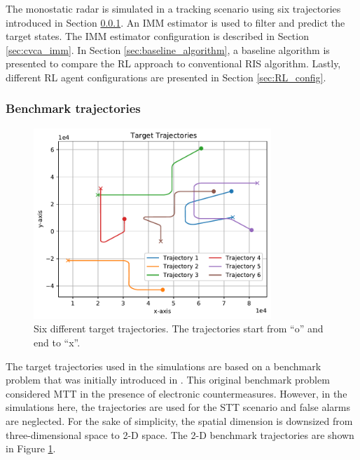 \documentclass[english, 12pt, a4paper, elec, utf8, a-1b, online]{aaltothesis}
\numberwithin{equation}{section}
\begin{document}
The monostatic radar is simulated in a tracking scenario using six trajectories introduced in Section \ref{sec:benchmark_trajectories}.
An IMM estimator is used to filter and predict the target states. 
The IMM estimator configuration is described in Section \ref{sec:cvca_imm}.
In Section \ref{sec:baseline_algorithm}, a baseline algorithm is presented to compare the RL approach to conventional RIS algorithm.
Lastly, different RL agent configurations are presented in Section \ref{sec:RL_config}.


\subsubsection{Benchmark trajectories} \label{sec:benchmark_trajectories}

\begin{figure}
    \centering
    \includegraphics[width=0.8\textwidth]{figures/benchmark/trajectories.pdf}
    \caption{Six different target trajectories. The trajectories start from ``o'' and end to ``x''.}
    \label{fig:benchmark_trajectories}
\end{figure}

The target trajectories used in the simulations are based on a benchmark problem that was initially introduced in \cite{Blair1998}.
This original benchmark problem considered MTT in the presence of electronic countermeasures.
However, in the simulations here, the trajectories are used for the STT scenario and false alarms are neglected.
For the sake of simplicity, the spatial dimension is downsized from three-dimensional space to 2-D space.
The 2-D benchmark trajectories are shown in Figure \ref{fig:benchmark_trajectories}.
\end{document}
